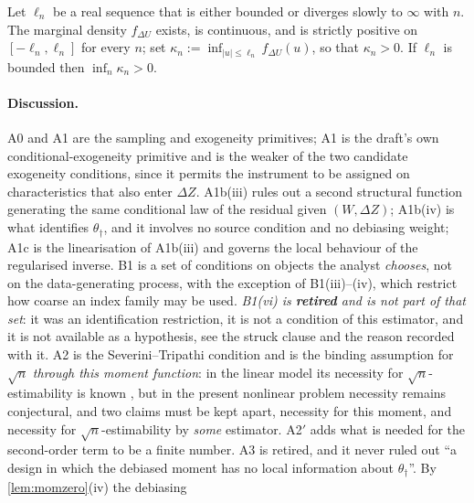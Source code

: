\begin{assumption}\label{ass:app4}
Let $\ell_n$ be a real sequence that is either bounded or diverges slowly to $\infty$ with $n$. The
marginal density $f_{\Delta U}$ exists, is continuous, and is strictly positive on $[-\ell_n,\ell_n]$
for every $n$; set $\kappa_n:=\inf_{|u|\le\ell_n}f_{\Delta U}(u)$, so that $\kappa_n>0$. If $\ell_n$ is
bounded then $\inf_n\kappa_n>0$.
\end{assumption}

\clearpage

\paragraph{Discussion.}
A0 and A1 are the sampling and exogeneity primitives; A1 is the draft's own conditional-exogeneity primitive and is
the weaker of the two candidate exogeneity conditions, since it permits the instrument to be assigned on
characteristics that also enter $\Delta Z$. A1b(iii) rules out a second structural function generating
the same conditional law of the residual given $(W,\Delta Z)$; A1b(iv) is what identifies
$\theta_\dagger$, and it involves no source condition and no debiasing weight; A1c is the linearisation
of A1b(iii) and governs the local behaviour of the regularised inverse. B1 is a set of conditions on
objects the analyst \emph{chooses}, not on the data-generating process, with the exception of
B1(iii)--(iv), which restrict how coarse an index family may be used. \emph{B1(vi) is \textbf{retired} and is
not part of that set}: it was an identification restriction, it is not a condition of this estimator, and it
is not available as a hypothesis, see the struck clause and the reason recorded with it. A2 is the
Severini--Tripathi condition and is the binding
assumption for $\sqrt n$ \emph{through this moment function}: in the linear model its necessity for
$\sqrt n$-estimability is known \citep{severini2006}, but in the present nonlinear problem necessity
remains conjectural, and two claims must be kept apart, necessity for this moment, and necessity for
$\sqrt n$-estimability by \emph{some} estimator. A2$'$ adds what is needed for the second-order term to
be a finite number. A3 is retired, and it never ruled out ``a design in which the
debiased moment has no local information about $\theta_\dagger$''. By \cref{lem:momzero}\textup{(iv)} the debiasing
